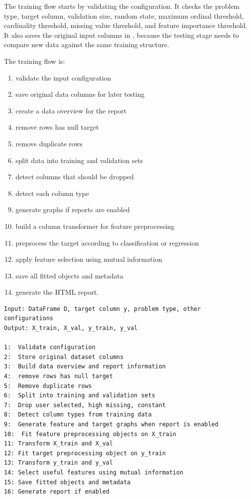 \documentclass[12pt,a4paper,oneside]{report}
\DeclareRobustCommand{\modulepath}[1]{\path{#1}}
\begin{document}
\noindent The training flow starts by validating the configuration. It checks the problem
type, target column, validation size, random state, maximum ordinal threshold,
cardinality threshold, missing value threshold, and feature importance
threshold. It also saves the original input columns in
\modulepath{data_columns.pkl}, because the testing stage needs to compare new
data against the same training structure.

\noindent The training flow is:

\begin{enumerate}[leftmargin=*]
  \item validate the input configuration
  \item save original data columns for later testing
  \item create a data overview for the report
  \item remove rows has null target
  \item remove duplicate rows
  \item split data into training and validation sets
  \item detect columns that should be dropped
  \item detect each column type
  \item generate graphs if reports are enabled
  \item build a column transformer for feature preprocessing
  \item preprocess the target according to classification or regression
  \item apply feature selection using mutual information
  \item save all fitted objects and metadata 
  \item generate the HTML report.
\end{enumerate}

\begin{lstlisting}[style=algostyle,caption={General tabular preprocessing flow}]
Input: DataFrame D, target column y, problem type, other configurations
Output: X_train, X_val, y_train, y_val

1:  Validate configuration
2:  Store original dataset columns
3:  Build data overview and report information
4:  remove rows has null target
5:  Remove duplicate rows
6:  Split into training and validation sets
7:  Drop user selected, high missing, constant
8:  Detect column types from training data
9:  Generate feature and target graphs when report is enabled
10:  Fit feature preprocessing objects on X_train
11: Transform X_train and X_val
12: Fit target preprocessing object on y_train
13: Transform y_train and y_val
14: Select useful features using mutual information
15: Save fitted objects and metadata
16: Generate report if enabled
\end{lstlisting}
\end{document}
